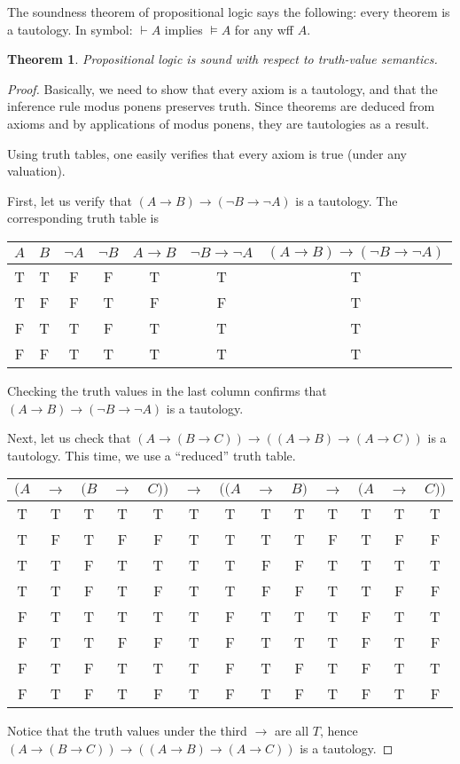 \documentclass[12pt]{article}
\newtheorem{thm}{Theorem}
\begin{document}
The soundness theorem of propositional logic says the following: every theorem is a tautology.  In symbol: $\vdash A$ implies $\models A$ for any wff $A$.

\begin{thm} Propositional logic is sound with respect to truth-value semantics. \end{thm}
\begin{proof}
Basically, we need to show that every axiom is a tautology, and that the inference rule modus ponens preserves truth.  Since theorems are deduced from axioms and by applications of modus ponens, they are tautologies as a result.

Using truth tables, one easily verifies that every axiom is true (under any valuation).

First, let us verify that $(A\to B)\to (\neg B\to \neg A)$ is a tautology.  The corresponding truth table is
\begin{center}
\begin{tabular}{ccccccc}
$A$ & $B$ & $\neg A$ & $\neg B$ & $A\to B$ & $\neg B\to \neg A$ & $(A\to B)\to (\neg B\to \neg A)$ \\
\hline 
T & T & F & F & T & T & T\\
T & F & F & T & F & F & T\\
F & T & T & F & T & T & T\\
F & F & T & T & T & T & T
\end{tabular}
\end{center}
Checking the truth values in the last column confirms that $(A\to B)\to (\neg B\to \neg A)$ is a tautology.

Next, let us check that $(A\to (B\to C))\to ((A\to B)\to (A\to C))$ is a tautology.  This time, we use a ``reduced'' truth table.

\begin{center}
\begin{tabular}{ccccccccccccc}
$(A$ & $\to$ & $(B$ & $\to$ & $C))$ & $\to$ & $((A$ & $\to$ & $B)$ & $\to$ & $(A$ & $\to$ & $C))$ \\
\hline 
T & T & T & T & T & T & T & T & T & T & T & T & T \\
T & F & T & F & F & T & T & T & T & F & T & F & F \\
T & T & F & T & T & T & T & F & F & T & T & T & T \\
T & T & F & T & F & T & T & F & F & T & T & F & F \\
F & T & T & T & T & T & F & T & T & T & F & T & T \\
F & T & T & F & F & T & F & T & T & T & F & T & F \\
F & T & F & T & T & T & F & T & F & T & F & T & T \\
F & T & F & T & F & T & F & T & F & T & F & T & F 
\end{tabular}
\end{center}
Notice that the truth values under the third $\to$ are all $T$, hence $(A\to (B\to C))\to ((A\to B)\to (A\to C))$ is a tautology.


\end{proof}
\end{document}
